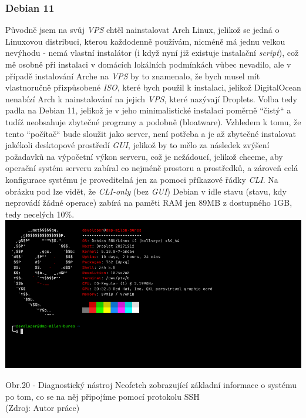 \documentclass[12pt,a4paper]{report}
\begin{document}
  \subsubsection{Debian 11}
  Původně jsem na svůj \emph{VPS} chtěl nainstalovat Arch Linux, jelikož se jedná o Linuxovou distribuci, kterou každodenně používám, nicméně má jednu velkou
  nevýhodu - nemá vlastní instalátor (i když nyní již existuje instalační \emph{script}), což mě osobně při
  instalaci v domácích lokálních podmínkách vůbec nevadilo, ale v případě instalování Arche na \emph{VPS}
  by to znamenalo, že bych musel mít vlastnoručně přizpůsobené \emph{ISO}, které bych použil k instalaci,
  jelikož DigitalOcean nenabízí Arch k nainstalování na jejich \emph{VPS}, které nazývají Droplets.
  Volba tedy padla na Debian 11, jelikož je v jeho minimalistické instalaci poměrně ``čistý`` \space a tudíž
  neobsahuje zbytečné programy a podobně (bloatware). Vzhledem k tomu, že tento ``počítač`` \space bude
  sloužit jako server, není potřeba a je až zbytečné instalovat jakékoli desktopové prostředí \emph{GUI},
  jelikož by to mělo za následek zvýšení požadavků na výpočetní
  výkon serveru, což je nežádoucí, jelikož chceme, aby operační systém serveru zabíral co nejméně
  prostoru a prostředků, a zároveň celá konfigurace systému je proveditelná jen za pomoci
  příkazové řádky \emph{CLI}. Na obrázku pod lze vidět, že \emph{CLI-only} (bez \emph{GUI}) Debian v idle
  stavu (stavu, kdy neprovádí žádné operace) zabírá na paměti RAM jen 89MB z dostupného 1GB,
  tedy necelých 10\%.
  \vfill
  \vspace*{0.5cm}
  \noindent\includegraphics[width=\linewidth]{VPS.png}
  \begin{center}
    Obr.20 -  Diagnostický nástroj Neofetch zobrazující základní informace o systému po tom, co se na něj připojíme pomocí protokolu SSH  \\
    (Zdroj: Autor práce)
  \end{center}
  \vspace*{0.5cm}
\end{document}
